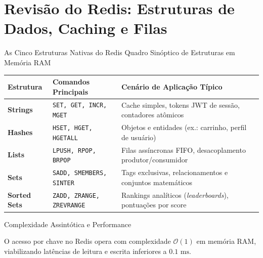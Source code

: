 \section[Revisão Redis: Estruturas e TTL]{Revisão do Redis: Estruturas de Dados, Caching e Filas}

\begin{frame}[fragile]{As Cinco Estruturas Nativas do Redis}
  \vspace{0.1cm}
  \alert{Quadro Sinóptico de Estruturas em Memória RAM}\par
  \vspace{0.3cm}
  \scriptsize
  \begin{tabular}{@{}llp{7.8cm}@{}}
    \toprule
    \textbf{Estrutura} & \textbf{Comandos Principais} & \textbf{Cenário de Aplicação Típico} \\
    \midrule
    \textbf{Strings}     & \lstinline[language=rediscli, basicstyle=\scriptsize\ttfamily]|SET, GET, INCR, MGET|       & Cache simples, tokens JWT de sessão, contadores atômicos \\
    \textbf{Hashes}      & \lstinline[language=rediscli, basicstyle=\scriptsize\ttfamily]|HSET, HGET, HGETALL|       & Objetos e entidades (ex.: carrinho, perfil de usuário) \\
    \textbf{Lists}       & \lstinline[language=rediscli, basicstyle=\scriptsize\ttfamily]|LPUSH, RPOP, BRPOP|        & Filas assíncronas FIFO, desacoplamento produtor/consumidor \\
    \textbf{Sets}        & \lstinline[language=rediscli, basicstyle=\scriptsize\ttfamily]|SADD, SMEMBERS, SINTER|    & Tags exclusivas, relacionamentos e conjuntos matemáticos \\
    \textbf{Sorted Sets} & \lstinline[language=rediscli, basicstyle=\scriptsize\ttfamily]|ZADD, ZRANGE, ZREVRANGE|   & Rankings analíticos (\textit{leaderboards}), pontuações por score \\
    \bottomrule
  \end{tabular}
  
  \vspace{0.35cm}
  \alert{Complexidade Assintótica e Performance}\par
  \footnotesize
  O acesso por chave no Redis opera com complexidade $\mathcal{O}(1)$ em memória RAM, viabilizando latências de leitura e escrita inferiores a $0.1\text{ ms}$.
\end{frame}

